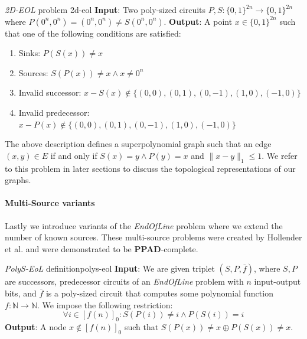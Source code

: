 \begin{definitionbox}{\textit{2D-EOL} problem \cite{chen_Complexity2DDiscrete_2009,hollender_ComplexityMultisourceVariants_2018}}{2d-eol}
    \textbf{Input}: Two poly-sized circuits $P,S: \{0,1\}^{2n} \to \{0,1\}^{2n}$ where $P(0^{n}, 0^{n}) = (0^{n},0^{n}) \neq S(0^{n}, 0^{n})$.
    \textbf{Output}: A point $x \in \{0,1\}^{2n}$ such that one of the following conditions are satisfied:
    \begin{enumerate}
        \item Sinks: $P(S(x)) \neq x$
        \item Sources: $S(P(x)) \neq  x \wedge x \neq 0^n$
        \item Invalid successor: $x - S(x) \not\in \{(0,0), (0,1), (0,-1), (1,0), (-1,0)\}$
        \item Invalid predecessor: $x - P(x) \not\in \{(0,0), (0,1), (0,-1), (1,0), (-1,0)\}$
    \end{enumerate}
\end{definitionbox}

The above description defines a superpolynomial graph such that an edge $(x,y) \in E$
if and only if $S(x) = y \wedge P(y) = x$ and $\|x-y\|_1 \leq 1$.
We refer to this problem in later sections to discuss the topological representations of our graphs.

\paragraph*{Multi-Source variants}
Lastly we introduce variants of the \textit{EndOfLine} problem
where we extend the number of known sources.
These
multi-source problems were created by Hollender et al. \cite{hollender_ComplexityMultisourceVariants_2018}
and were demonstrated to be \textbf{PPAD}-complete.

\begin{definitionbox}{\textit{PolyS-EoL} definition}{polys-eol}
    \textbf{Input}: We are given triplet $(S, P, \bar{f})$, where $S, P$ are successors, predecessor circuits
    of an \textit{EndOfLine} problem with $n$ input-output bits, and $\bar{f}$ is a poly-sized circuit that computes some polynomial function
    $f: \mathbb{N}\to \mathbb{N}$. We impose the following restriction:
    $$
        \forall i \in [f(n)]_0: S(P(i)) \neq i \wedge P(S(i)) = i
    $$
    \textbf{Output}: A node $x \not\in [f(n)]_0$ such that $S(P(x)) \neq x \oplus P(S(x)) \neq x$.
\end{definitionbox}



